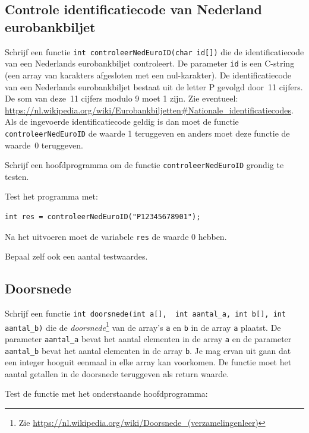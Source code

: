 \documentclass[a4paper,10pt,fleqn,twoside]{article}
\begin{document}
\subsection{Controle identificatiecode van Nederland eurobankbiljet}
Schrijf een functie \lstinline|int controleerNedEuroID(char id[])| die de identificatiecode van een Nederlands eurobankbiljet controleert. De parameter \lstinline|id| is een C-string (een array van karakters afgesloten met een nul-karakter). De identificatiecode van een Nederlands eurobankbiljet bestaat uit de letter P gevolgd door~11 cijfers. De som van deze~11 cijfers modulo 9 moet 1 zijn. Zie eventueel: \url{https://nl.wikipedia.org/wiki/Eurobankbiljetten#Nationale_identificatiecodes}. Als de ingevoerde identificatiecode geldig is dan moet de functie \lstinline|controleerNedEuroID| de waarde 1 teruggeven en anders moet deze functie de waarde~0 teruggeven.

Schrijf een hoofdprogramma om de functie \lstinline|controleerNedEuroID| grondig te testen.

Test het programma met:

\begin{lstlisting}
int res = controleerNedEuroID("P12345678901");
\end{lstlisting}

Na het uitvoeren moet de variabele \lstinline|res| de waarde 0 hebben.

Bepaal zelf ook een aantal testwaardes.

\subsection{Doorsnede}
Schrijf een functie \mbox{\lstinline[columns=fixed]|int doorsnede(int a[],  int aantal_a, int b[], int aantal_b)|} die de \textsl{doorsnede}\footnote{Zie \url{https://nl.wikipedia.org/wiki/Doorsnede_(verzamelingenleer)}} van de array’s \lstinline|a| en \lstinline|b| in de array \lstinline|a| plaatst. De parameter \lstinline|aantal_a| bevat het aantal elementen in de array \lstinline|a| en de parameter \lstinline|aantal_b| bevat het aantal elementen in de array \lstinline|b|. Je mag ervan uit gaan dat een integer hooguit eenmaal in elke array kan voorkomen. De functie moet het aantal getallen in de doorsnede teruggeven als return waarde. 


Test de functie met het onderstaande hoofdprogramma:
\end{document}
